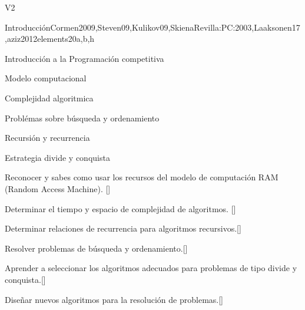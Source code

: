 \begin{syllabus}
  \begin{competences}{V2}
      \item {}
      \item {}
      \item {}
  \end{competences}
  
  \begin{unit}{Introducción}{}{Cormen2009,Steven09,Kulikov09,SkienaRevilla:PC:2003,Laaksonen17,aziz2012elements}{20}{a,b,h}
      \begin{topics}
        \item Introducción a la Programación competitiva
        \item Modelo computacional
        \item Complejidad algoritmica
        \item Problémas sobre búsqueda y ordenamiento
        \item Recursión y recurrencia 
        \item Estrategia divide y conquista
    \end{topics}
    \begin{learningoutcomes}
        \item Reconocer y sabes como usar los recursos del modelo de computación RAM (Random Access Machine). [\Usage]
        \item Determinar el tiempo y espacio de complejidad de algoritmos. [\Usage]
        \item Determinar relaciones de recurrencia para algoritmos recursivos.[\Usage]
        \item Resolver problemas de búsqueda y ordenamiento.[\Usage]
        \item Aprender a seleccionar los algoritmos adecuados para problemas de tipo divide y conquista.[\Usage]
        \item Diseñar nuevos algoritmos para la resolución de problemas.[\Usage]
    \end{learningoutcomes}
  \end{unit}
  

\end{syllabus}
